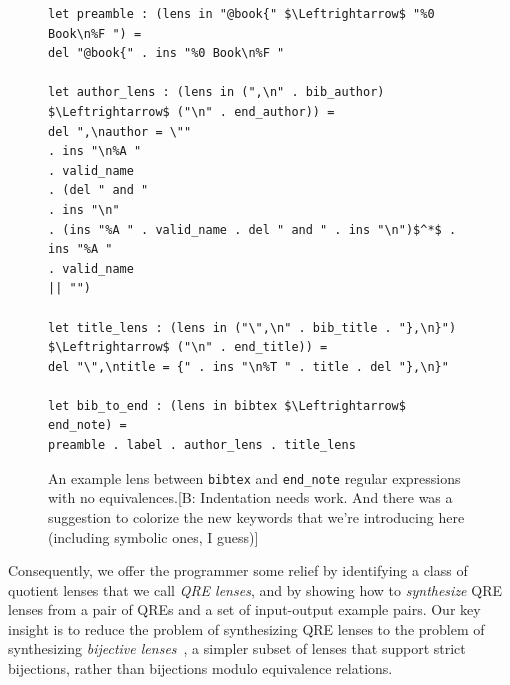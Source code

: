 \documentclass[acmsmall,review,anonymous]{acmart}\settopmatter{printfolios=true,printccs=false,printacmref=false}
\newcommand{\FINISH}[3]{\ifdraft\textcolor{#1}{[#2: #3]}\fi}
\newcommand{\bcp}[1]{\FINISH{dkred}{B}{#1}}
\newcommand{\bibtex}{\textsc{Bib}\TeX{}}
\newcommand{\cd}[1]{\lstinline[backgroundcolor=\color{white}]$#1$}
\begin{document}

\begin{figure}[t]
\begin{lstlisting}
let preamble : (lens in "@book{" $\Leftrightarrow$ "%0 Book\n%F ") =
del "@book{" . ins "%0 Book\n%F "

let author_lens : (lens in (",\n" . bib_author) $\Leftrightarrow$ ("\n" . end_author)) =
del ",\nauthor = \""
. ins "\n%A "
. valid_name
. (del " and "
. ins "\n"
. (ins "%A " . valid_name . del " and " . ins "\n")$^*$ . ins "%A "
. valid_name
|| "")

let title_lens : (lens in ("\",\n" . bib_title . "},\n}") $\Leftrightarrow$ ("\n" . end_title)) =
del "\",\ntitle = {" . ins "\n%T " . title . del "},\n}"

let bib_to_end : (lens in bibtex $\Leftrightarrow$ end_note) =
preamble . label . author_lens . title_lens
\end{lstlisting}
\caption{An example lens between \cd{bibtex} and \cd{end_note} regular
expressions with no equivalences.\bcp{Indentation needs work.  And there was
a suggestion to colorize the new keywords that we're introducing here
(including symbolic ones, I guess)}} 
\label{fig:example-lens}
\end{figure}


Consequently, we offer the programmer some relief by identifying a class of
quotient lenses that we call {\em QRE lenses}, and by showing how to {\em synthesize}
QRE lenses from a pair of QREs and a set of input-output example pairs. Our key
insight is to reduce the problem of synthesizing QRE lenses to the problem of
synthesizing {\em bijective lenses}~\cite{optician}, a simpler subset of
lenses that support strict bijections, rather than bijections modulo
equivalence relations.
\end{document}

